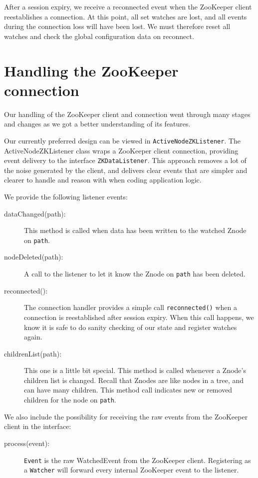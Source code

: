 After a session expiry, we receive a reconnected event when the ZooKeeper client reestablishes a connection. At this point, all set watches are lost, and all events during the connection loss will have been lost. We must therefore reset all watches and check the global configuration data on reconnect. 

\section{Handling the ZooKeeper connection}
Our handling of the ZooKeeper client and connection went through many stages and changes as we got a better understanding of its features.

Our currently preferred design can be viewed in \texttt{ActiveNodeZKListener}.
The ActiveNodeZKListener class wraps a ZooKeeper client connection, providing event delivery to the interface \texttt{ZKDataListener}. 
This approach removes a lot of the noise generated by the client, and delivers clear events that are simpler and clearer to handle and reason with when coding application logic.

We provide the following listener events:
\begin{description}

	\item[dataChanged(path):] 
		This method is called when data has been written to the watched Znode on \texttt{path}.
	\item[nodeDeleted(path):] 
		A call to the listener to let it know the Znode on \texttt{path} has been deleted.
	\item[reconnected():] 
		The connection handler provides a simple call \texttt{reconnected()} when a connection is reestablished after session expiry. When this call happens, we know it is safe to do sanity checking of our state and register watches again.
	\item[childrenList(path):]
		This one is a little bit special. This method is called whenever a Znode's children list is changed. Recall that Znodes are like nodes in a tree, and can have many children. This method call indicates new or removed children for the node on \texttt{path}.

\end{description}

We also include the possibility for receiving the raw events from the ZooKeeper client in the interface:

\begin{description}
	\item[process(event):]
		\texttt{Event} is the raw WatchedEvent from the ZooKeeper client. Registering as a \texttt{Watcher} will forward every internal ZooKeeper event to the listener.

\end{description}




